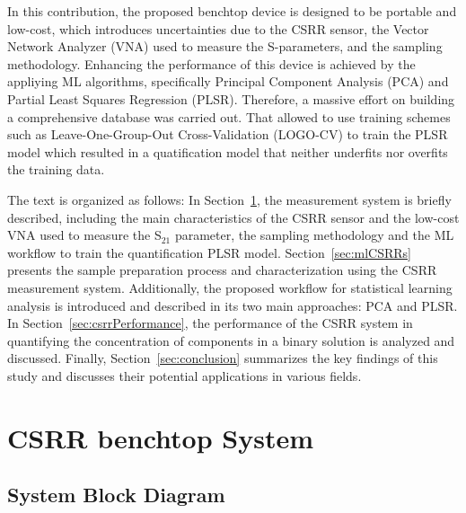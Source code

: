 \documentclass[journal,twoside,web]{ieeecolor}
\begin{document}
In this contribution, the proposed benchtop device is designed to be portable and low-cost, which introduces uncertainties due to the CSRR sensor, the Vector Network Analyzer (VNA) used to measure the S-parameters, and the sampling methodology. Enhancing the performance of this device is achieved by the appliying ML algorithms, specifically Principal Component Analysis (PCA) and Partial Least Squares Regression (PLSR). Therefore, a massive effort on building a comprehensive database was carried out. That allowed to use training schemes such as Leave-One-Group-Out Cross-Validation (LOGO-CV) to train the PLSR model which resulted in a quatification model that neither underfits nor overfits the training data. 

The text is organized as follows: In Section~\ref{sec:csrrbenchTop}, the measurement system is briefly described, including the main characteristics of the CSRR sensor and the low-cost VNA used to measure the S$_{21}$ parameter, the sampling methodology and the ML workflow to train the quantification PLSR model. Section~\ref{sec:mlCSRRs} presents the sample preparation process and characterization using the CSRR measurement system. Additionally, the proposed workflow for statistical learning analysis is introduced and described in its two main approaches: PCA and PLSR. In Section~\ref{sec:csrrPerformance}, the performance of the CSRR system in quantifying the concentration of components in a binary solution is analyzed and discussed. Finally, Section~\ref{sec:conclusion} summarizes the key findings of this study and discusses their potential applications in various fields.        

\section{CSRR benchtop System}\label{sec:csrrbenchTop}
\subsection{System Block Diagram}\label{ssec:sysBlockD}
\end{document}
